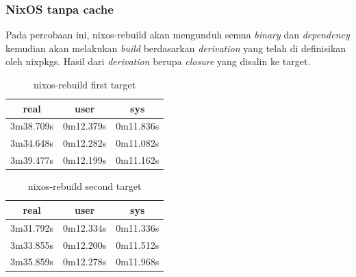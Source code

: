 \documentclass[10pt,]{report}
\begin{document}
\begin{adjustwidth}{20pt}{}
	\subsubsection{NixOS tanpa cache}
	\begin{adjustwidth}{20pt}{}
		Pada percobaan ini, nixos-rebuild akan mengunduh semua \textit{binary} dan
		\textit{dependency} kemudian akan melakukan \textit{build} berdasarkan
		\textit{derivation} yang telah di definisikan oleh nixpkgs. Hasil dari
		\textit{derivation} berupa \textit{closure} yang disalin ke target.
	\end{adjustwidth}
	\begin{table}[H]
		\caption{nixos-rebuild first target}
		\begin{center}
			\begin{tabular}[c]{|c|c|c|}
				\hline
				\multicolumn{1}{|c|}{\textbf{real}} &
				\multicolumn{1}{c|}{\textbf{user}}  &
				\multicolumn{1}{c|}{\textbf{sys}}                           \\
				\hline
				3m38.709s                           & 0m12.379s & 0m11.836s \\
				\hline
				3m34.648s                           & 0m12.282s & 0m11.082s \\
				\hline
				3m39.477s                           & 0m12.199s & 0m11.162s \\
				\hline
			\end{tabular}
		\end{center}
	\end{table}
	\begin{table}[H]
		\caption{nixos-rebuild second target}
		\begin{center}
			\begin{tabular}[c]{|c|c|c|}
				\hline
				\multicolumn{1}{|c|}{\textbf{real}} &
				\multicolumn{1}{c|}{\textbf{user}}  &
				\multicolumn{1}{c|}{\textbf{sys}}                           \\
				\hline
				3m31.792s                           & 0m12.334s & 0m11.336s \\
				\hline
				3m33.855s                           & 0m12.200s & 0m11.512s \\
				\hline
				3m35.859s                           & 0m12.278s & 0m11.968s \\
				\hline
			\end{tabular}
		\end{center}
	\end{table}

\end{adjustwidth}
\end{document}
